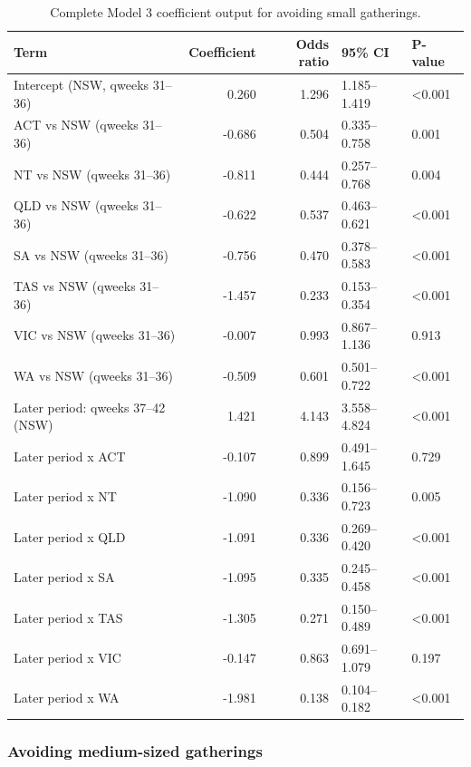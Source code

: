 \documentclass[
  12pt,
  a4paper,
]{article}
\begin{document}
\begin{longtable}[t]{lrrll}
\caption{\label{tab:model3-small-appendix}Complete Model 3 coefficient output for avoiding small gatherings.}\\
\toprule
Term & Coefficient & Odds ratio & 95\% CI & P-value\\
\midrule
Intercept (NSW, qweeks 31--36) & 0.260 & 1.296 & 1.185--1.419 & <0.001\\
ACT vs NSW (qweeks 31--36) & -0.686 & 0.504 & 0.335--0.758 & 0.001\\
NT vs NSW (qweeks 31--36) & -0.811 & 0.444 & 0.257--0.768 & 0.004\\
QLD vs NSW (qweeks 31--36) & -0.622 & 0.537 & 0.463--0.621 & <0.001\\
SA vs NSW (qweeks 31--36) & -0.756 & 0.470 & 0.378--0.583 & <0.001\\
\addlinespace
TAS vs NSW (qweeks 31--36) & -1.457 & 0.233 & 0.153--0.354 & <0.001\\
VIC vs NSW (qweeks 31--36) & -0.007 & 0.993 & 0.867--1.136 & 0.913\\
WA vs NSW (qweeks 31--36) & -0.509 & 0.601 & 0.501--0.722 & <0.001\\
Later period: qweeks 37--42 (NSW) & 1.421 & 4.143 & 3.558--4.824 & <0.001\\
Later period x ACT & -0.107 & 0.899 & 0.491--1.645 & 0.729\\
\addlinespace
Later period x NT & -1.090 & 0.336 & 0.156--0.723 & 0.005\\
Later period x QLD & -1.091 & 0.336 & 0.269--0.420 & <0.001\\
Later period x SA & -1.095 & 0.335 & 0.245--0.458 & <0.001\\
Later period x TAS & -1.305 & 0.271 & 0.150--0.489 & <0.001\\
Later period x VIC & -0.147 & 0.863 & 0.691--1.079 & 0.197\\
\addlinespace
Later period x WA & -1.981 & 0.138 & 0.104--0.182 & <0.001\\
\bottomrule
\end{longtable}

\clearpage

\subsubsection{Avoiding medium-sized gatherings}\label{avoiding-medium-sized-gatherings}
\end{document}
